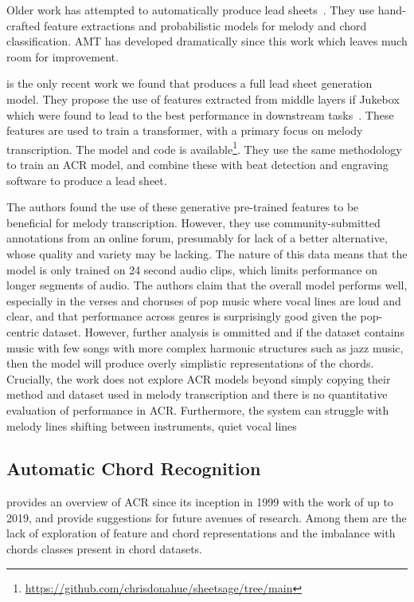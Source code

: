 Older work has attempted to automatically produce lead sheets~\citep{LeadSheet2008,LeadSheet2009}. They use hand-crafted feature extractions and probabilistic models for melody and chord classification. AMT has developed dramatically since this work which leaves much room for improvement.

\citep{MelodyTranscriptionViaGenerativePreTraining} is the only recent work we found that produces a full lead sheet generation model. They propose the use of features extracted from middle layers if Jukebox~\citep{Jukebox} which were found to lead to the best performance in downstream tasks~\citep{JukeBoxFeatureExtraction}. These features are used to train a transformer, with a primary focus on melody transcription. The model and code is available\footnote{\url{https://github.com/chrisdonahue/sheetsage/tree/main}}. They use the same methodology to train an ACR model, and combine these with beat detection and engraving software to produce a lead sheet.

The authors found the use of these generative pre-trained features to be beneficial for melody transcription. However, they use community-submitted annotations from an online forum, presumably for lack of a better alternative, whose quality and variety may be lacking. The nature of this data means that the model is only trained on 24 second audio clips, which limits performance on longer segments of audio. The authors claim that the overall model performs well, especially in the verses and choruses of pop music where vocal lines are loud and clear, and that performance across genres is surprisingly good given the pop-centric dataset. However, further analysis is ommitted and if the dataset contains music with few songs with more complex harmonic structures such as jazz music, then the model will produce overly simplistic representations of the chords. Crucially, the work does not explore ACR models beyond simply copying their method and dataset used in melody transcription and there is no quantitative evaluation of performance in ACR. Furthermore, the system can struggle with melody lines shifting between instruments, quiet vocal lines

\subsection{Automatic Chord Recognition}

\cite{20YearsofACR} provides an overview of ACR since its inception in 1999 with the work of \citet{FujishimaACR} up to 2019, and provide suggestions for future avenues of research. Among them are the lack of exploration of feature and chord representations and the imbalance with chords classes present in chord datasets.

